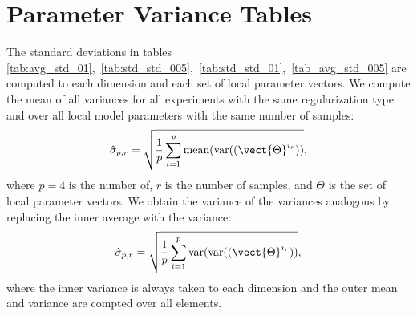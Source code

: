 \section{Parameter Variance Tables}
The standard deviations in tables \ref{tab:avg_std_01},~\ref{tab:std_std_005},~\ref{tab:std_std_01},~\ref{tab_avg_std_005} are computed \wrt to each dimension and each set of local parameter vectors.
We compute the mean of all variances for all experiments with the same regularization type and over all local model parameters with the same number of samples:
\begin{equation}
    \label{eq:meanvar}
    \hat{\sigma}_{p,r} = \sqrt{\frac{1}{p} \sum_{i=1}^p \text{mean}(\text{var}((\vect{\Theta}^{i_r}))},
\end{equation}
where $p=4$ is the number of, $r$ is the number of samples, and $\Theta$ is the set of local parameter vectors.
We obtain the variance of the variances analogous by replacing the inner average with the variance:
\begin{equation}
    \label{eq:varvar}
    \hat{\sigma}_{p,r} = \sqrt{\frac{1}{p} \sum_{i=1}^p \text{var}(\text{var}((\vect{\Theta}^{i_r}))},
\end{equation}
where the inner variance is always taken \wrt to each dimension and the outer mean and variance are compted over all elements.

